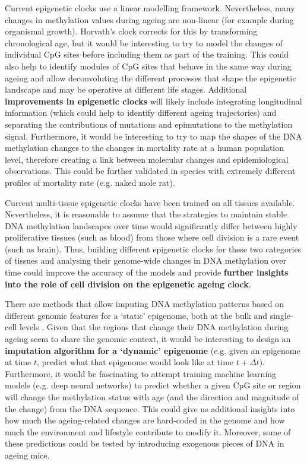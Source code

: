 \bigskip

Current epigenetic clocks use a linear modelling framework. Nevertheless, many changes in methylation values during ageing are non-linear (for example during organismal growth). Horvath's clock corrects for this by transforming chronological age, but it would be interesting to try to model the changes of individual CpG sites before including them as part of the training. This could also help to identify modules of CpG sites that behave in the same way during ageing and allow deconvoluting the different processes that shape the epigenetic landscape and may be operative at different life stages. Additional \textbf{improvements in epigenetic clocks} will likely include integrating longitudinal information (which could help to identify different ageing trajectories) \citep{Jensen2014} and separating the contributions of mutations and epimutations to the methylation signal. Furthermore, it would be interesting to try to map the shapes of the DNA methylation changes to the changes in mortality rate at a human population level, therefore creating a link between molecular changes and epidemiological observations. This could be further validated in species with extremely different profiles of mortality rate (e.g. naked mole rat).

\bigskip

Current multi-tissue epigenetic clocks have been trained on all tissues available. Nevertheless, it is reasonable to assume that the strategies to maintain stable DNA methylation landscapes over time would significantly differ between highly proliferative tissues (such as blood) from those where cell division is a rare event (such as brain). Thus, building different epigenetic clocks for these two categories of tissues and analysing their genome-wide changes in DNA methylation over time could improve the accuracy of the models and provide \textbf{further insights into the role of cell division on the epigenetic ageing clock}.

\bigskip

There are methods that allow imputing DNA methylation patterns based on different genomic features for a `static' epigenome, both at the bulk \citep{Zhang2015} and single-cell levels \citep{Angermueller2017,Kapourani2019}. Given that the regions that change their DNA methylation during ageing seem to share the genomic context, it would be interesting to design an \textbf{imputation algorithm for a `dynamic' epigenome} (e.g. given an epigenome at time $t$, predict what that epigenome would look like at time $t + \Delta t$). Furthermore, it would be fascinating to attempt training machine learning models (e.g. deep neural networks) to predict whether a given CpG site or region will change the methylation status with age (and the direction and magnitude of the change) from the DNA sequence. This could give us additional insights into how much the ageing-related changes are hard-coded in the genome and how much the environment and lifestyle contribute to modify it. Moreover, some of these predictions could be tested by introducing exogenous pieces of DNA in ageing mice.

